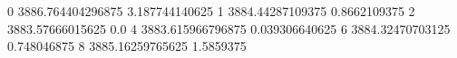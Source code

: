 0 3886.764404296875 3.187744140625
1 3884.44287109375 0.8662109375
2 3883.57666015625 0.0
4 3883.615966796875 0.039306640625
6 3884.32470703125 0.748046875
8 3885.16259765625 1.5859375
